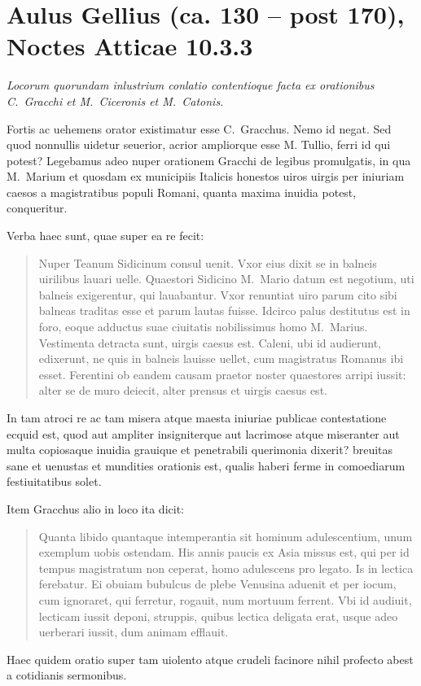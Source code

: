 \section*{Aulus Gellius (ca. 130 – post 170), Noctes Atticae 10.3.3}

\textit{Locorum quorundam inlustrium conlatio contentioque facta ex orationibus C.~Gracchi et M.~Ciceronis et M.~Catonis.}

\medskip

Fortis ac uehemens orator existimatur esse C.~Gracchus. Nemo id negat. Sed quod nonnullis uidetur seuerior, acrior ampliorque esse M. Tullio, ferri id qui potest? Legebamus adeo nuper orationem Gracchi de legibus promulgatis, in qua M.~Marium et quosdam ex municipiis Italicis honestos uiros uirgis per iniuriam caesos a magistratibus populi Romani, quanta maxima inuidia potest, conqueritur.

Verba haec sunt, quae super ea re fecit:
\begin{quotation}
\noindent Nuper Teanum Sidicinum consul uenit. Vxor eius dixit se in balneis uirilibus lauari uelle. Quaestori Sidicino M.\ Mario datum est negotium, uti balneis exigerentur, qui lauabantur. Vxor renuntiat uiro parum cito sibi balneas traditas esse et parum lautas fuisse. Idcirco palus destitutus est in foro, eoque adductus suae ciuitatis nobilissimus homo M.\ Marius. Vestimenta detracta sunt, uirgis caesus est. Caleni, ubi id audierunt, edixerunt, ne quis in balneis lauisse uellet, cum magistratus Romanus ibi esset. Ferentini ob eandem causam praetor noster quaestores arripi iussit: alter se de muro deiecit, alter prensus et uirgis caesus est.
\end{quotation}


In tam atroci re ac tam misera atque maesta iniuriae publicae contestatione ecquid est, quod aut ampliter insigniterque aut lacrimose atque miseranter aut multa copiosaque inuidia grauique et penetrabili querimonia dixerit? breuitas sane et uenustas et mundities orationis est, qualis haberi ferme in comoediarum festiuitatibus solet.

Item Gracchus alio in loco ita dicit:
\begin{quotation}
\noindent Quanta libido quantaque intemperantia sit hominum adulescentium, unum exemplum uobis ostendam. His annis paucis ex Asia missus est, qui per id tempus magistratum non ceperat, homo adulescens pro legato. Is in lectica ferebatur. Ei obuiam bubulcus de plebe Venusina aduenit et per iocum, cum ignoraret, qui ferretur, rogauit, num mortuum ferrent. Vbi id audiuit, lecticam iussit deponi, struppis, quibus lectica deligata erat, usque adeo uerberari iussit, dum animam efflauit.
\end{quotation}

Haec quidem oratio super tam uiolento atque crudeli facinore nihil profecto abest a cotidianis sermonibus.
